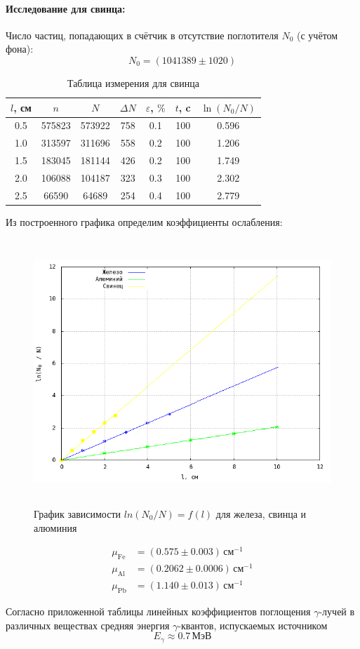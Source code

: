 \documentclass[12pt]{article}
\begin{document}
\paragraph*{Исследование для свинца: }
\par
	Число частиц, попадающих в счётчик в отсутствие поглотителя $N_0$ (с учётом фона):
\[
	N_0 = \left(1041389 \pm 1020\right)
\]
\begin{table}[h!]
	\centering
	\begin{tabular}{|c|c|c|c|c|c|c|}
	\hline
		$l$, см & $n$ & $N$ & $\Delta N$ & $\varepsilon$, $\%$ & $t$, c & $\ln(N_0 / N)$  \\
	\hline
		0.5	& 575823	& 573922	& 758	& 0.1 & 100 &	0.596 \\
	\hline		
		1.0	& 313597	& 311696	& 558	& 0.2 & 100 & 	1.206 \\
	\hline		
		1.5	& 183045	& 181144	& 426	& 0.2 & 100 &	1.749 \\
	\hline		
		2.0	& 106088	& 104187	& 323	& 0.3 & 100 &	2.302 \\
	\hline	
		2.5	& 66590	& 64689	& 254	& 0.4 & 100 &	2.779 \\
	\hline
	\end{tabular}
	\caption{Таблица измерения для свинца}
\end{table}
\par
	Из построенного графика определим коэффициенты ослабления:
\newpage
\begin{figure}[h!]
	\centering
	\includegraphics[width = 14cm, height = 10cm]{plot1.png}
	\caption{График зависимости $ln(N_0 / N) = f(l)$ для железа, свинца и алюминия}
\end{figure}
\begin{align*}
	\mu_\text{Fe} &= \left(0.575 \pm 0.003\right) \, \text{см}^{-1} \\
	\mu_\text{Al} &= \left(0.2062 \pm 0.0006\right) \, \text{см}^{-1} \\
	\mu_\text{Pb} &= \left(1.140 \pm 0.013\right) \, \text{см}^{-1} \
\end{align*}

\par
	Согласно приложенной таблицы линейных коэффициентов поглощения $\gamma$-лучей в различных веществах средняя энергия $\gamma$-квантов, испускаемых источником
\[
	E_\gamma \approx 0.7 \, \text{МэВ}
\]
\end{document}

